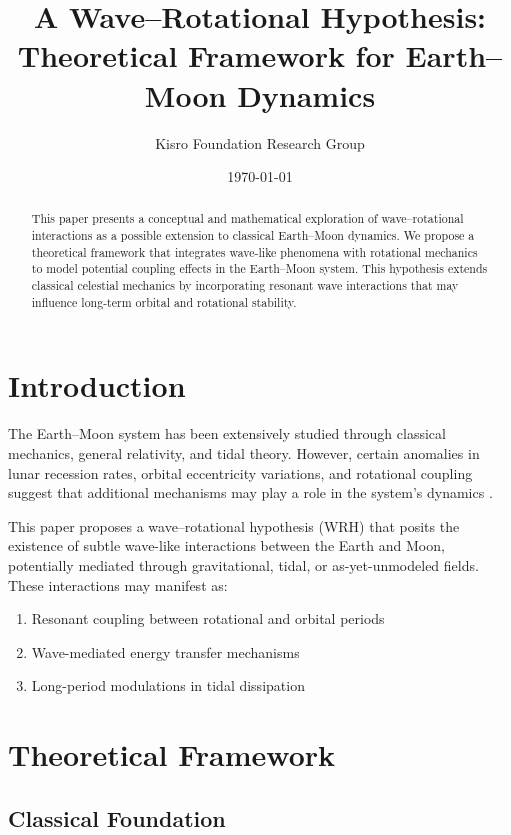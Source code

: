 \documentclass[12pt,a4paper]{article}
\title{A Wave–Rotational Hypothesis: \\
Theoretical Framework for Earth–Moon Dynamics}
\author{Kisro Foundation Research Group}
\date{\today}
\begin{document}
\maketitle

\begin{abstract}
This paper presents a conceptual and mathematical exploration of wave–rotational interactions as a possible extension to classical Earth–Moon dynamics. We propose a theoretical framework that integrates wave-like phenomena with rotational mechanics to model potential coupling effects in the Earth–Moon system. This hypothesis extends classical celestial mechanics by incorporating resonant wave interactions that may influence long-term orbital and rotational stability.
\end{abstract}

\section{Introduction}

The Earth–Moon system has been extensively studied through classical mechanics, general relativity, and tidal theory. However, certain anomalies in lunar recession rates, orbital eccentricity variations, and rotational coupling suggest that additional mechanisms may play a role in the system's dynamics \cite{dickey1994,williams2001}.

This paper proposes a wave–rotational hypothesis (WRH) that posits the existence of subtle wave-like interactions between the Earth and Moon, potentially mediated through gravitational, tidal, or as-yet-unmodeled fields. These interactions may manifest as:

\begin{enumerate}
    \item Resonant coupling between rotational and orbital periods
    \item Wave-mediated energy transfer mechanisms
    \item Long-period modulations in tidal dissipation
\end{enumerate}

\section{Theoretical Framework}

\subsection{Classical Foundation}
\end{document}
